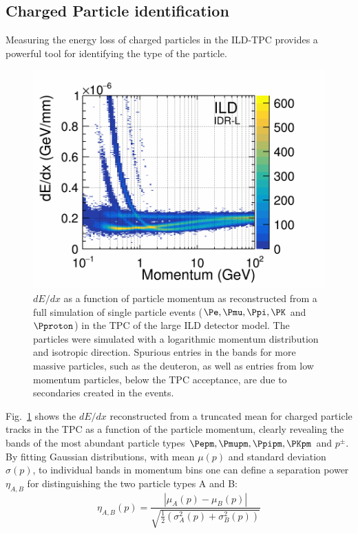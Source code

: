 \subsection{Charged Particle identification}
\label{sec:perf:sys:pid}
%
%
Measuring the energy loss of charged particles in the ILD-TPC provides a powerful tool for identifying the type of the particle.
\begin{figure}[htbp]
\begin{center}
\includegraphics[width=0.8\hsize]{Performance/fig/dEdx_BBAll_lowGran_bigCap.png}
\end{center}
\caption{\label{fig:perf:dedx_tpc}
  $dE/dx$ as a function of particle momentum as reconstructed from a full simulation of single particle events ($\Pe, \Pmu, \Ppi, \PK$ and $\Pproton$)
  in the TPC of the large ILD detector model. The particles were simulated with a logarithmic momentum distribution and isotropic direction. Spurious
  entries in the bands for more massive particles, such as the deuteron, as well as entries from low momentum particles, below the TPC acceptance,
  are due to secondaries created in the events.
}
\end{figure}
%
Fig.~\ref{fig:perf:dedx_tpc} shows the $dE/dx$ reconstructed from a truncated mean for charged particle tracks in the TPC as a function of
the particle momentum, clearly revealing the bands of the most abundant particle types $\Pepm, \Pmupm, \Ppipm, \PKpm$ and $p^{\pm}$.
By fitting Gaussian distributions, with mean $\mu(p)$ and standard deviation $\sigma(p)$, to individual bands in momentum bins one can
define a separation power $\eta_{A,B}$ for distinguishing the two particle types A and B:
\begin{equation}
\eta_{A,B}(p) = \frac{ |\mu_A(p) - \mu_B(p)| } { \sqrt{ \frac{1}{2} ( \sigma^2_A(p) + \sigma^2_B(p) )  }  }
\label{ild:eq:seppow}
\end{equation}
